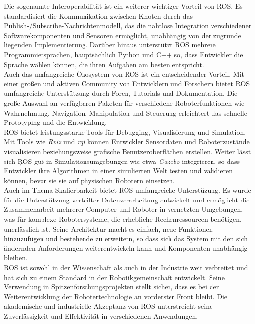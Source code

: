 \noindent
Die sogenannte Interoperabilität ist ein weiterer wichtiger Vorteil von \ac{ROS}. Es standardisiert die Kommunikation zwischen Knoten durch das Publish-/Subscribe-Nachrichtenmodell, das die nahtlose Integration verschiedener Softwarekomponenten und Sensoren ermöglicht, unabhängig von der zugrunde liegenden Implementierung. Darüber hinaus unterstützt \ac{ROS} mehrere Programmiersprachen, hauptsächlich Python und C++ so, dass Entwickler die Sprache wählen können, die ihren Aufgaben am besten entspricht.
\\

\noindent
Auch das umfangreiche Ökosystem von \ac{ROS} ist ein entscheidender Vorteil. Mit einer großen und aktiven Community von Entwicklern und Forschern bietet \ac{ROS} umfangreiche Unterstützung durch Foren, Tutorials und Dokumentation. Die große Auswahl an verfügbaren Paketen für verschiedene Roboterfunktionen wie Wahrnehmung, Navigation, Manipulation und Steuerung erleichtert das schnelle Prototyping und die Entwicklung.
\\

\noindent
\ac{ROS} bietet leistungsstarke Tools für Debugging, Visualisierung und Simulation. Mit Tools wie \textit{Rviz} und \textit{rqt} können Entwickler Sensordaten und Roboterzustände visualisieren beziehungsweise grafische Benutzeroberflächen erstellen. Weiter lässt sich \c{ROS} gut in Simulationsumgebungen wie etwa \textit{Gazebo} integrieren, so dass Entwickler ihre Algorithmen in einer simulierten Welt testen und validieren können, bevor sie sie auf physischen Robotern einsetzen.
\\

\noindent
Auch im Thema Skalierbarkeit bietet \ac{ROS} umfangreiche Unterstüzung. Es wurde für die Unterstützung verteilter Datenverarbeitung entwickelt und ermöglicht die Zusammenarbeit mehrerer Computer und Roboter in vernetzten Umgebungen, was für komplexe Robotersysteme, die erhebliche Rechenressourcen benötigen, unerlässlich ist. Seine Architektur macht es einfach, neue Funktionen hinzuzufügen und bestehende zu erweitern, so dass sich das System mit den sich ändernden Anforderungen weiterentwickeln kann und Komponenten unabhängig bleiben.
\\

\noindent
\ac{ROS} ist sowohl in der Wissenschaft als auch in der Industrie weit verbreitet und hat sich zu einem Standard in der Robotikgemeinschaft entwickelt. Seine Verwendung in Spitzenforschungsprojekten stellt sicher, dass es bei der Weiterentwicklung der Robotertechnologie an vorderster Front bleibt. Die akademische und industrielle Akzeptanz von ROS unterstreicht seine Zuverlässigkeit und Effektivität in verschiedenen Anwendungen.
\\

